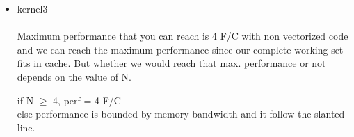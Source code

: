 \documentclass[letterpaper, 11pt]{article}
\begin{document}
\begin{itemize}
\begin{itemize}
\begin{center}
\end{center}
\item kernel3 \\ \\
Maximum performance that you can reach is 4 F/C with non vectorized code and we can reach the maximum performance since our complete working set fits in cache. But whether we would reach that max. performance or not depends on the value of N.
\begin{center}
if N $\geq$ 4, perf = 4 F/C \\
else performance is bounded by memory bandwidth and it follow the slanted line.
\end{center}
\end{itemize}
\end{itemize}

\bigskip

\clearpage

\end{document}
